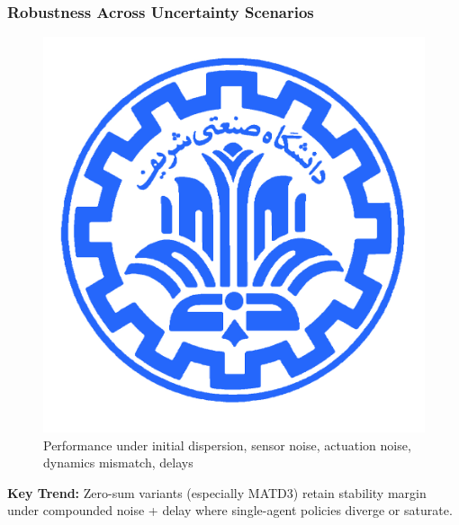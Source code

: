 \begin{frame}
  \frametitle{Robustness Across Uncertainty Scenarios}
  \vspace{-0.25cm}
  \begin{figure}
    \centering
    \includegraphics[width=.8\linewidth]{robustness_comparison_all.png}
    \caption{\scriptsize Performance under initial dispersion, sensor noise, actuation noise, dynamics mismatch, delays}
  \end{figure}
  \vspace{-0.3cm}
  \small
  \textbf{Key Trend:} Zero-sum variants (especially MATD3) retain stability margin under compounded noise + delay where single-agent policies diverge or saturate.
\end{frame}

